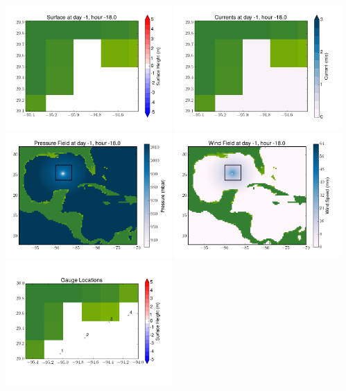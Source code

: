 \documentclass[11pt]{article}
\begin{document}
\includegraphics[width=0.475\textwidth]{frame0030fig6.png}
\vskip 10pt 
\includegraphics[width=0.475\textwidth]{frame0030fig7.png}
\includegraphics[width=0.475\textwidth]{frame0030fig8.png}
\vskip 10pt 
\includegraphics[width=0.475\textwidth]{frame0030fig9.png}
\includegraphics[width=0.475\textwidth]{frame0030fig10.png}
\end{document}
